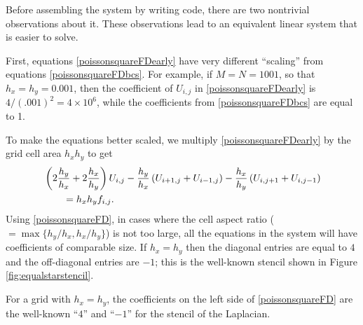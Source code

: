 Before assembling the system by writing \PETSc code, there are two nontrivial observations about it.  These observations lead to an equivalent linear system that is easier to solve.

First, equations \eqref{poissonsquareFDearly} have very different ``scaling'' from equations \eqref{poissonsquareFDbcs}.  For example, if $M=N=1001$, so that $h_x=h_y=0.001$, then the coefficient of $U_{i,j}$ in \eqref{poissonsquareFDearly} is $4/(.001)^2 = 4 \times 10^6$, while the coefficients from \eqref{poissonsquareFDbcs} are equal to 1.

To make the equations better scaled, we multiply \eqref{poissonsquareFDearly} by the grid cell area $h_x h_y$ to get
\begin{align}
&\left(2 \frac{h_y}{h_x} + 2 \frac{h_x}{h_y}\right) U_{i,j} - \frac{h_y}{h_x}\left(U_{i+1,j} + U_{i-1,j}\right)  - \frac{h_x}{h_y}\left(U_{i,j+1} + U_{i,j-1}\right) \label{poissonsquareFD} \\
&\qquad = h_x h_y f_{i,j}. \notag
\end{align}
Using \eqref{poissonsquareFD}, in cases where the cell aspect ratio ($=\max\{h_y/h_x,h_x/h_y\}$) is not too large, all the equations in the system will have coefficients of comparable size.  If $h_x=h_y$ then the diagonal entries are equal to $4$ and the off-diagonal entries are $-1$; this is the well-known stencil shown in Figure \ref{fig:equalstarstencil}.

\begin{marginfigure}
\caption{For a grid with $h_x=h_y$, the coefficients on the left side of \eqref{poissonsquareFD} are the well-known ``$4$'' and ``$-1$'' for the stencil of the Laplacian.}
\label{fig:equalstarstencil}
\end{marginfigure}

